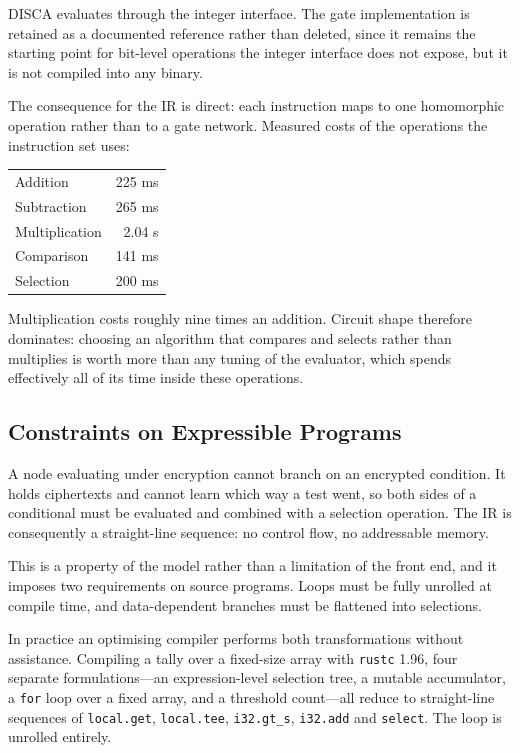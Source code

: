 \documentclass[12pt,a4paper]{article}
\begin{document}
DISCA evaluates through the integer interface.
The gate implementation is retained as a documented reference rather than deleted, since it remains the starting point for bit-level operations the integer interface does not expose, but it is not compiled into any binary.

The consequence for the IR is direct: each instruction maps to one homomorphic operation rather than to a gate network.
Measured costs of the operations the instruction set uses:

\begin{center}
\begin{tabular}{lr}
\hline
Addition & 225 ms \\
Subtraction & 265 ms \\
Multiplication & 2.04 s \\
Comparison & 141 ms \\
Selection & 200 ms \\
\hline
\end{tabular}
\end{center}

Multiplication costs roughly nine times an addition.
Circuit shape therefore dominates: choosing an algorithm that compares and selects rather than multiplies is worth more than any tuning of the evaluator, which spends effectively all of its time inside these operations.

\subsection{Constraints on Expressible Programs}

A node evaluating under encryption cannot branch on an encrypted condition.
It holds ciphertexts and cannot learn which way a test went, so both sides of a conditional must be evaluated and combined with a selection operation.
The IR is consequently a straight-line sequence: no control flow, no addressable memory.

This is a property of the model rather than a limitation of the front end, and it imposes two requirements on source programs.
Loops must be fully unrolled at compile time, and data-dependent branches must be flattened into selections.

In practice an optimising compiler performs both transformations without assistance.
Compiling a tally over a fixed-size array with \texttt{rustc} 1.96, four separate formulations---an expression-level selection tree, a mutable accumulator, a \texttt{for} loop over a fixed array, and a threshold count---all reduce to straight-line sequences of \texttt{local.get}, \texttt{local.tee}, \texttt{i32.gt\_s}, \texttt{i32.add} and \texttt{select}.
The loop is unrolled entirely.
\end{document}
